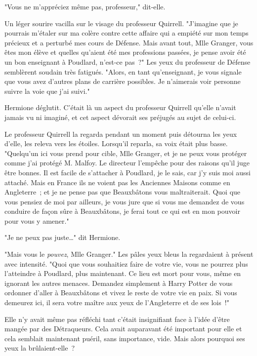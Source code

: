 "Vous ne m'appréciez même pas, professeur," dit-elle.

Un léger sourire vacilla sur le visage du professeur Quirrell. "J'imagine que je pourrais m'étaler sur ma colère contre cette affaire qui a empiété sur mon temps précieux et a perturbé mes cours de Défense. Mais avant tout, Mlle Granger, vous êtes mon élève et quelles qu'aient été mes professions passées, je pense avoir été un bon enseignant à Poudlard, n'est-ce pas~?" Les yeux du professeur de Défense semblèrent soudain très fatigués. "Alors, en tant qu'enseignant, je vous signale que vous avez d'autres plans de carrière possibles. Je n'aimerais voir personne suivre la voie que j'ai suivi."

Hermione déglutit. C'était là un aspect du professeur Quirrell qu'elle n'avait jamais vu ni imaginé, et cet aspect dévorait ses préjugés au sujet de celui-ci.

Le professeur Quirrell la regarda pendant un moment puis détourna les yeux d'elle, les releva vers les étoiles. Lorsqu'il reparla, sa voix était plus basse. "Quelqu'un ici vous prend pour cible, Mlle Granger, et je ne peux vous protéger comme j'ai protégé M. Malfoy. Le directeur l'empêche pour des raisons qu'il juge être bonnes. Il est facile de s'attacher à Poudlard, je le sais, car j'y suis moi aussi attaché. Mais en France ils ne voient pas les Anciennes Maisons comme en Angleterre~; et je ne pense pas que Beauxbâtons vous maltraiterait. Quoi que vous pensiez de moi par ailleurs, je vous jure que si vous me demandez de vous conduire de façon sûre à Beauxbâtons, je ferai tout ce qui est en mon pouvoir pour vous y amener."

"Je ne peux pas juste…" dit Hermione.

"Mais vous le \emph{pouvez}, Mlle Granger." Les pâles yeux bleus la regardaient à présent avec intensité. "Quoi que vous souhaitiez faire de votre vie, vous ne pourrez plus l'atteindre à Poudlard, plus maintenant. Ce lieu est mort pour vous, même en ignorant les autres menaces. Demandez simplement à Harry Potter de vous ordonner d'aller à Beauxbâtons et vivez le reste de votre vie en paix. Si vous demeurez ici, il sera votre maître aux yeux de l'Angleterre et de ses lois~!"

Elle n'y avait même pas réfléchi tant c'était insignifiant face à l'idée d'être mangée par des Détraqueurs. Cela avait auparavant été important pour elle et cela semblait maintenant puéril, sans importance, vide. Mais alors pourquoi ses yeux la brûlaient-elle~?

